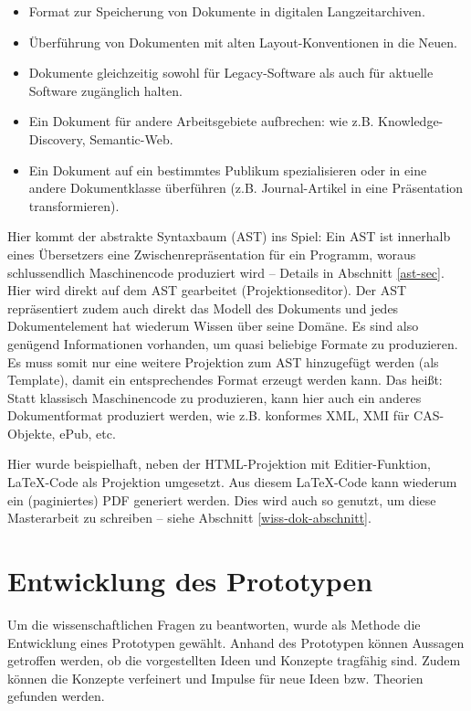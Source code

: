  
\begin{itemize}

\item Format zur Speicherung von Dokumente in digitalen Langzeitarchiven.
\item Überführung von Dokumenten mit alten Layout-Konventionen in die Neuen.
\item Dokumente gleichzeitig sowohl für Legacy-Software als auch für aktuelle Software zugänglich halten.
\item Ein Dokument für andere Arbeitsgebiete aufbrechen: wie z.B. Knowledge-Discovery, Semantic-Web.
\item Ein Dokument auf ein bestimmtes Publikum spezialisieren oder in eine andere Dokumentklasse überführen (z.B. Journal-Artikel in eine Präsentation transformieren).
\end{itemize}
 
Hier kommt der abstrakte Syntaxbaum (AST) ins Spiel: Ein AST ist innerhalb eines Übersetzers eine Zwischenrepräsentation für ein Programm, woraus schlussendlich Maschinencode produziert wird -- Details in Abschnitt \ref{ast-sec}. Hier wird direkt auf dem AST gearbeitet (Projektionseditor). Der AST repräsentiert zudem auch direkt das Modell des Dokuments und jedes Dokumentelement hat wiederum Wissen über seine Domäne. Es sind also genügend Informationen vorhanden, um quasi beliebige Formate zu produzieren. Es muss somit nur eine weitere Projektion zum AST hinzugefügt werden (als Template), damit ein entsprechendes Format erzeugt werden kann. Das heißt: Statt klassisch Maschinencode zu produzieren, kann hier auch ein anderes Dokumentformat produziert werden, wie z.B. \citep{NISO} konformes XML, XMI für CAS-Objekte, ePub, etc.

 
Hier wurde beispielhaft, neben der HTML-Projektion mit Editier-Funktion, LaTeX-Code als Projektion umgesetzt. Aus diesem LaTeX-Code kann wiederum ein (paginiertes) PDF generiert werden. Dies wird auch so genutzt, um diese Masterarbeit zu schreiben -- siehe Abschnitt \ref{wiss-dok-abschnitt}.

 
\chapter{Entwicklung des Prototypen}\label{}
 
Um die wissenschaftlichen Fragen zu beantworten, wurde als Methode die Entwicklung eines Prototypen gewählt. Anhand des Prototypen können Aussagen getroffen werden, ob die vorgestellten Ideen und Konzepte tragfähig sind. Zudem können die Konzepte verfeinert und Impulse für neue Ideen bzw. Theorien gefunden werden.

